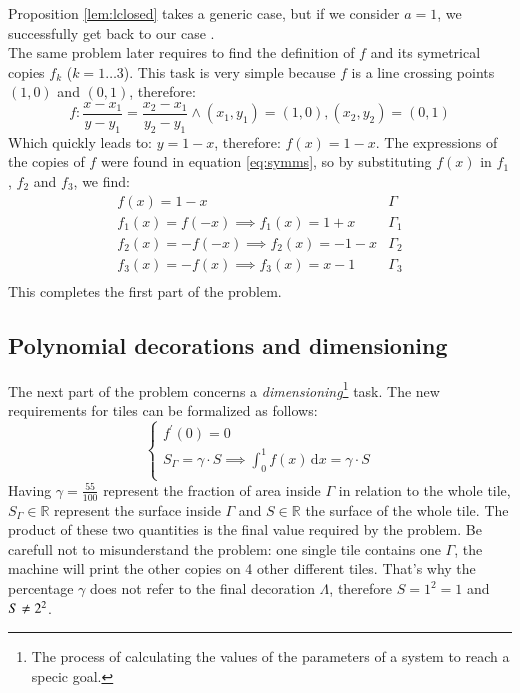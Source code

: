 Proposition \ref{lem:lclosed} takes a generic case, but if we consider $a=1$, we
successfully get back to our case \cite{exam1}.\\

The same problem later requires to find the definition of $f$ and its symetrical
copies $f_k$ ($k = 1 \dots 3$). This task is very simple because $f$ is a line
crossing points $(1,0)$ and $(0,1)$, therefore:
\begin{equation*}
f: \frac{x-x_1}{y-y_1} = \frac{x_2-x_1}{y_2-y_1} \wedge (x_1,y_1) = (1,0), 
(x_2,y_2) = (0,1)
\end{equation*}
Which quickly leads to: $y = 1-x$, therefore: $f(x) = 1-x$. The expressions of the
copies of $f$ were found in equation \ref{eq:symms}, so by substituting $f(x)$
in $f_1$, $f_2$ and $f_3$, we find:
\begin{equation}\label{eq:exprs}
\begin{array}{l|c}
f(x) = 1 - x & \Gamma \\
f_1(x) = f(-x) \implies f_1(x) = 1 + x & \Gamma_1 \\
f_2(x) = -f(-x) \implies f_2(x) = - 1 - x & \Gamma_2 \\
f_3(x) = -f(x) \implies f_3(x) = x - 1 & \Gamma_3 \\
\end{array}
\end{equation}
This completes the first part of the problem.

\subsection{Polynomial decorations and dimensioning}
\label{sec:p1}

The next part of the problem concerns a \emph{dimensioning}\footnote{The
process of calculating the values of the parameters of a system
to reach a specic goal.} task.
The new requirements for tiles can be formalized as follows:
\begin{equation}
\label{eq:fconds2}
\begin{cases}
f^\prime(0) = 0\\
S_{\Gamma} = \gamma \cdot S \implies 
   \int^{1}_{0} f(x) \, \mathrm{d} x = \gamma \cdot S\\
\end{cases}
\end{equation}
Having $\gamma = \frac{55}{100}$ represent the fraction of area inside $\Gamma$
in relation to the whole tile, 
$S_{\Gamma} \in \mathbb{R}$ represent the surface 
inside $\Gamma$ and $S \in \mathbb{R}$ the
surface of the whole tile. The product of these two quantities is the final value 
required by the problem. 
Be carefull not to misunderstand the problem: one single tile contains one $\Gamma$,
the machine will print the other copies on 4 other different tiles. That's why the
percentage $\gamma$ does not refer to the final decoration $\Lambda$, therefore
$S = 1^2 = 1$ and $S \not\eq 2 ^ 2$. 

